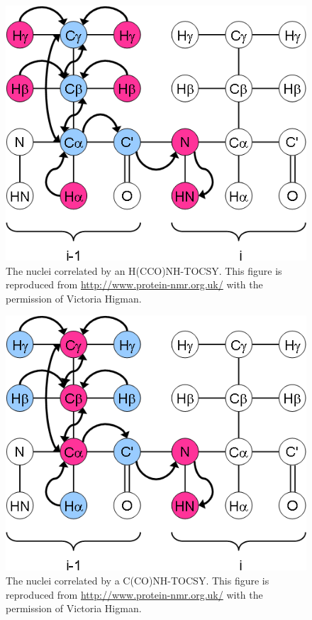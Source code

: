 \begin{figure}
  \includegraphics[scale=0.75]{figures/ccpn_hcconhtocsy}
  \caption[The nuclei correlated by an H(CCO)NH-TOCSY.]
          {The nuclei correlated by an H(CCO)NH-TOCSY.
           This figure is reproduced from \url{http://www.protein-nmr.org.uk/}
           with the permission of Victoria Higman.}
  \label{ccpn_hcconhtocsy}
\end{figure}

\begin{figure}
  \includegraphics[scale=0.75]{figures/ccpn_cconhtocsy}
  \caption[The nuclei correlated by a C(CO)NH-TOCSY.]
          {The nuclei correlated by a C(CO)NH-TOCSY.
           This figure is reproduced from \url{http://www.protein-nmr.org.uk/}
           with the permission of Victoria Higman.}
  \label{ccpn_cconhtocsy}
\end{figure}

